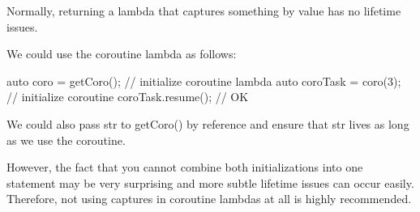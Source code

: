Normally, returning a lambda that captures something by value has no lifetime issues.

We could use the coroutine lambda as follows:

\begin{cpp}
auto coro = getCoro(); // initialize coroutine lambda
auto coroTask = coro(3); // initialize coroutine
coroTask.resume(); // OK
\end{cpp}

We could also pass str to getCoro() by reference and ensure that str lives as long as we use the coroutine.

However, the fact that you cannot combine both initializations into one statement may be very surprising and more subtle lifetime issues can occur easily. Therefore, not using captures in coroutine lambdas at all is highly recommended.

